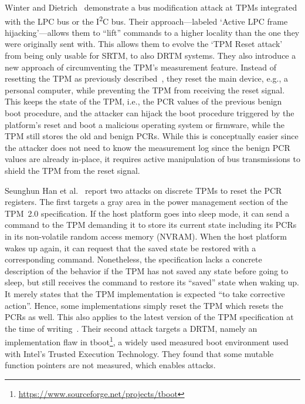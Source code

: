 Winter and Dietrich~\cite{Winter2013} demonstrate a bus modification attack at TPMs integrated with the LPC bus or the I\textsuperscript{2}C bus.
Their approach---labeled `Active LPC frame hijacking'---allows them to ``lift'' commands to a higher locality than the one they were originally sent with.
This allows them to evolve the `TPM Reset attack' from being only usable for \ac{SRTM}, to also \ac{DRTM} systems.
They also introduce a new approach of circumventing the TPM's measurement feature.
Instead of resetting the TPM as previously described~\cite{kauerBernhard,sparks2007}, they reset the main device, e.g., a personal computer, while preventing the TPM from receiving the reset signal.
This keeps the state of the TPM, i.e., the \ac{PCR} values of the previous benign boot procedure, and the attacker can hijack the boot procedure triggered by the platform's reset and boot a malicious operating system or firmware, while the TPM still stores the old and benign PCRs.
While this is conceptually easier since the attacker does not need to know the measurement log since the benign \ac{PCR} values are already in-place, it requires active manipulation of bus transmissions to shield the TPM from the reset signal.

Seunghun Han et al.~\cite{aBadDream} report two attacks on discrete TPMs to reset the PCR registers.
The first targets a gray area in the power management section of the TPM~2.0 specification.
If the host platform goes into sleep mode, it can send a command to the TPM demanding it to store its current state including its PCRs in its non-volatile random access memory (NVRAM).
When the host platform wakes up again, it can request that the saved state be restored with a corresponding command.
Nonetheless, the specification lacks a concrete description of the behavior if the TPM has not saved any state before going to sleep, but still receives the command to restore its ``saved'' state when waking up.
It merely states that the TPM implementation is expected ``to take corrective action''.
Hence, some implementations simply reset the TPM which resets the \acp{PCR} as well.
This also applies to the latest version of the TPM specification at the time of writing~\cite{tpm20}.
Their second attack targets a \ac{DRTM}, namely an implementation flaw in tboot\footnote{\url{https://www.sourceforge.net/projects/tboot}}, a widely used measured boot environment used with Intel's Trusted Execution Technology.
They found that some mutable function pointers are not measured, which enables attacks.

